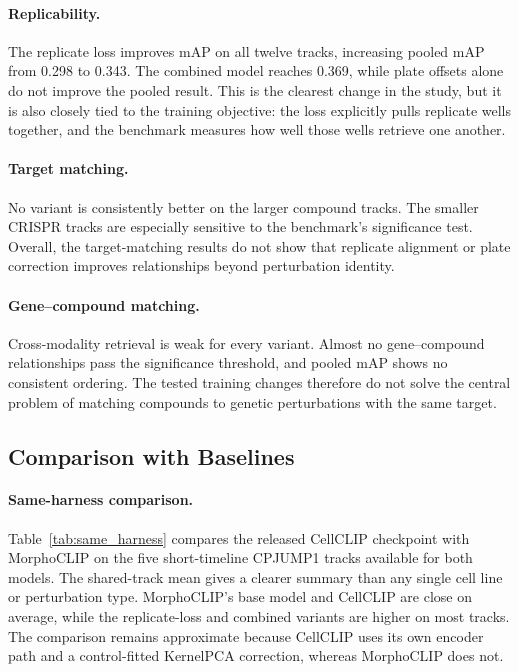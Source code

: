 \paragraph{Replicability.}
The replicate loss improves mAP on all twelve tracks, increasing pooled mAP from 0.298 to 0.343.
The combined model reaches 0.369, while plate offsets alone do not improve the pooled result. This
is the clearest change in the study, but it is also closely tied to the training objective: the
loss explicitly pulls replicate wells together, and the benchmark measures how well those wells
retrieve one another.

\paragraph{Target matching.}
No variant is consistently better on the larger compound tracks. The smaller CRISPR tracks are
especially sensitive to the benchmark's significance test. Overall, the target-matching results do
not show that replicate alignment or plate correction improves relationships beyond perturbation
identity.

\paragraph{Gene--compound matching.}
Cross-modality retrieval is weak for every variant. Almost no gene--compound relationships pass the
significance threshold, and pooled mAP shows no consistent ordering. The tested training changes
therefore do not solve the central problem of matching compounds to genetic perturbations with the
same target.

\subsection{Comparison with Baselines}

\paragraph{Same-harness comparison.}
Table~\ref{tab:same_harness} compares the released CellCLIP checkpoint with MorphoCLIP on the five
short-timeline CPJUMP1 tracks available for both models. The shared-track mean gives a clearer
summary than any single cell line or perturbation type. MorphoCLIP's base model and CellCLIP are
close on average, while the replicate-loss and combined variants are higher on most tracks. The
comparison remains approximate because CellCLIP uses its own encoder path and a control-fitted
KernelPCA correction, whereas MorphoCLIP does not.

